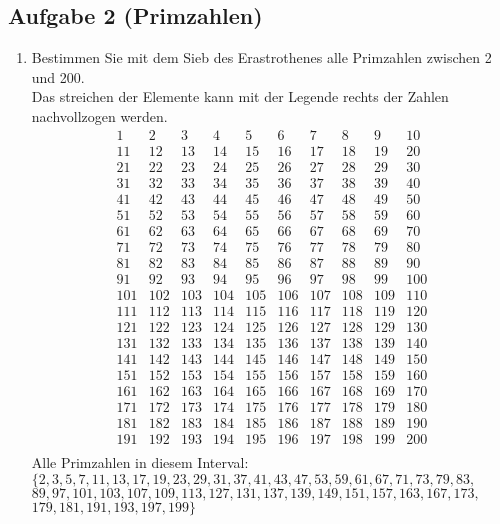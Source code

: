 \documentclass[11pt,a4paper,ngerman]{article}
\begin{document}


\subsection*{Aufgabe 2 (Primzahlen)}

\begin{enumerate}[\bfseries a)]

\item Bestimmen Sie mit dem Sieb des Erastrothenes alle Primzahlen zwischen 2 und 200. \\
Das streichen der Elemente kann mit der Legende rechts der Zahlen nachvollzogen werden.\\
$$
\begin{array}{cccccccccc}
1 & 2 & 3 & 4 & 5 & 6 & 7 & 8 & 9 & 10 \\
11 & 12 & 13 & 14 & 15 & 16 & 17 & 18 & 19 & 20 \\
21 & 22 & 23 & 24 & 25 & 26 & 27 & 28 & 29 & 30 \\
31 & 32 & 33 & 34 & 35 & 36 & 37 & 38 & 39 & 40 \\
41 & 42 & 43 & 44 & 45 & 46 & 47 & 48 & 49 & 50 \\
51 & 52 & 53 & 54 & 55 & 56 & 57 & 58 & 59 & 60 \\
61 & 62 & 63 & 64 & 65 & 66 & 67 & 68 & 69 & 70 \\
71 & 72 & 73 & 74 & 75 & 76 & 77 & 78 & 79 & 80 \\
81 & 82 & 83 & 84 & 85 & 86 & 87 & 88 & 89 & 90 \\
91 & 92 & 93 & 94 & 95 & 96 & 97 & 98 & 99 & 100 \\
101 & 102 & 103 & 104 & 105 & 106 & 107 & 108 & 109 & 110 \\
111 & 112 & 113 & 114 & 115 & 116 & 117 & 118 & 119 & 120 \\
121 & 122 & 123 & 124 & 125 & 126 & 127 & 128 & 129 & 130 \\
131 & 132 & 133 & 134 & 135 & 136 & 137 & 138 & 139 & 140 \\
141 & 142 & 143 & 144 & 145 & 146 & 147 & 148 & 149 & 150 \\
151 & 152 & 153 & 154 & 155 & 156 & 157 & 158 & 159 & 160 \\
161 & 162 & 163 & 164 & 165 & 166 & 167 & 168 & 169 & 170 \\
171 & 172 & 173 & 174 & 175 & 176 & 177 & 178 & 179 & 180 \\
181 & 182 & 183 & 184 & 185 & 186 & 187 & 188 & 189 & 190 \\
191 & 192 & 193 & 194 & 195 & 196 & 197 & 198 & 199 & 200 \\
\end{array}
$$
Alle Primzahlen in diesem Interval:\\
$\{2, 3, 5, 7, 11 ,13, 17, 19,23, 29, 31, 37, 41, 43, 47, 53, 59, 61, 67, 71, 73, 79, 83,$\\
$ 89, 97, 101, 103, 107, 109, 113, 127, 131, 137, 139, 149, 151, 157, 163, 167, 173,$\\
$ 179, 181, 191, 193, 197, 199\}$\\


\end{enumerate}
\end{document}
